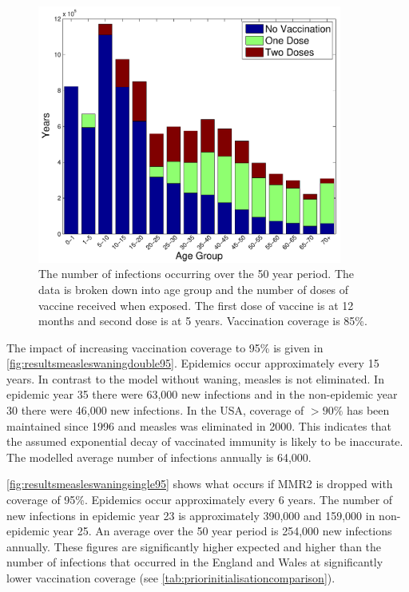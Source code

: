 \documentclass[a4paper,11pt] {scrartcl}
\begin{document}
\begin{figure}[h]
	\centering
	\includegraphics[width=100mm]{infectiondosesbreakdowndouble85}
	\caption{The number of infections occurring over the 50 year period. The data is broken down into age group and the number of doses of vaccine received when exposed. The first dose of vaccine is at 12 months and second dose is at 5 years. Vaccination coverage is 85\%.}
	\label{fig:resultsinfectiondosesbreakdowndouble85}
\end{figure}

The impact of increasing vaccination coverage to 95\% is given in \autoref{fig:resultsmeasleswaningdouble95}. Epidemics occur approximately every 15 years. In contrast to the model without waning, measles is not eliminated. In epidemic year 35 there were 63,000 new infections and in the non-epidemic year 30 there were 46,000 new infections. In the USA, coverage of $>90\%$ has been maintained since 1996 and measles was eliminated in 2000\cite{cdcmeasleselimination}. This indicates that the assumed exponential decay of vaccinated immunity is likely to be inaccurate. The modelled average number of infections annually is 64,000. 

\autoref{fig:resultsmeasleswaningsingle95} shows what occurs if MMR2 is dropped with coverage of 95\%. Epidemics occur approximately every 6 years. The number of new infections in epidemic year 23 is approximately 390,000 and 159,000 in non-epidemic year 25. An average over the 50 year period is 254,000 new infections annually. These figures are significantly higher expected and higher than the number of infections that occurred in the England and Wales at significantly lower vaccination coverage (see \autoref{tab:priorinitialisationcomparison}).
\end{document}
